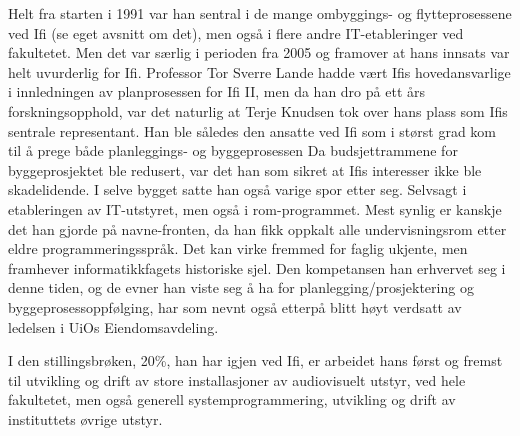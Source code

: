 Helt fra starten i 1991 var han sentral i de mange ombyggings- og flytteprosessene ved Ifi (se eget avsnitt om det), men også i flere andre IT-etableringer ved fakultetet. Men det var særlig i perioden fra 2005 og framover at hans innsats var helt uvurderlig for Ifi. Professor Tor Sverre Lande hadde vært Ifis hovedansvarlige i innledningen av planprosessen for Ifi II, men da han dro på ett års forskningsopphold, var det naturlig at Terje Knudsen tok over hans plass som Ifis sentrale representant. Han ble således den ansatte ved Ifi som i størst grad kom til å prege både planleggings-
og byggeprosessen Da budsjettrammene for byggeprosjektet ble redusert, var det han som sikret at Ifis interesser ikke ble skadelidende. I selve bygget satte han også varige spor etter seg. Selvsagt i etableringen av IT-utstyret, men også i rom-programmet. Mest synlig er kanskje det han gjorde på navne-fronten, da han fikk oppkalt alle undervisningsrom etter eldre programmeringsspråk. Det kan virke fremmed for faglig ukjente, men framhever informatikkfagets historiske sjel. Den kompetansen han erhvervet seg i denne tiden, og de evner han viste seg å ha for planlegging/prosjektering og byggeprosessoppfølging, har som nevnt også etterpå blitt høyt verdsatt av ledelsen i UiOs
Eiendomsavdeling.

I den stillingsbrøken, 20\%, han har igjen ved Ifi, er arbeidet hans først og fremst til utvikling og drift av store installasjoner av audiovisuelt utstyr, ved hele fakultetet, men også generell systemprogrammering, utvikling og drift av instituttets øvrige utstyr.

